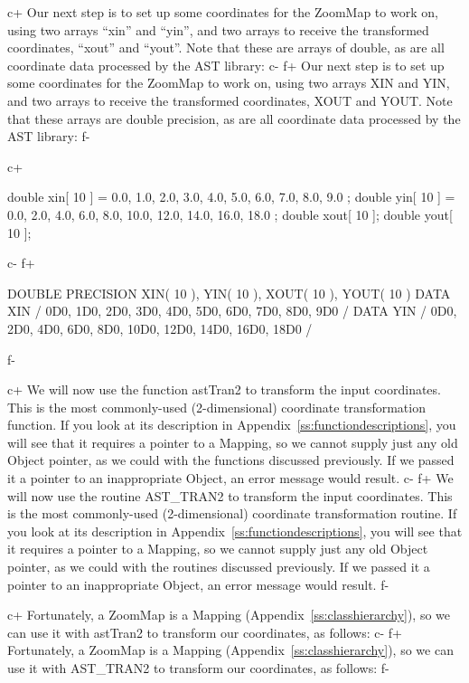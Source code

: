 \documentclass[twoside,11pt]{starlink}
\providecommand{\appref}[1]{Appendix~\ref{#1}}
\begin{document}
c+
Our next step is to set up some coordinates for the ZoomMap to work
on, using two arrays ``xin'' and ``yin'', and two arrays to receive
the transformed coordinates, ``xout'' and ``yout''.  Note that these
are arrays of double, as are all coordinate data processed by the AST
library:
c-
f+
Our next step is to set up some coordinates for the ZoomMap to work
on, using two arrays XIN and YIN, and two arrays to receive the
transformed coordinates, XOUT and YOUT.  Note that these arrays are
double precision, as are all coordinate data processed by the AST
library:
f-

c+
\small
\begin{terminalv}
double xin[ 10 ] = { 0.0, 1.0, 2.0, 3.0, 4.0, 5.0, 6.0, 7.0, 8.0, 9.0 };
double yin[ 10 ] = { 0.0, 2.0, 4.0, 6.0, 8.0, 10.0, 12.0, 14.0, 16.0, 18.0 };
double xout[ 10 ];
double yout[ 10 ];
\end{terminalv}
\normalsize
c-
f+
\small
\begin{terminalv}
      DOUBLE PRECISION XIN( 10 ), YIN( 10 ), XOUT( 10 ), YOUT( 10 )
      DATA XIN / 0D0, 1D0, 2D0, 3D0, 4D0, 5D0, 6D0, 7D0, 8D0, 9D0 /
      DATA YIN / 0D0, 2D0, 4D0, 6D0, 8D0, 10D0, 12D0, 14D0, 16D0, 18D0 /
\end{terminalv}
\normalsize
f-

c+
We will now use the function astTran2 to transform the input
coordinates. This is the most commonly-used (2-dimensional) coordinate
transformation function. If you look at its description in
\appref{ss:functiondescriptions}, you will see that it requires a
pointer to a Mapping, so we cannot supply just any old Object pointer,
as we could with the functions discussed previously. If we passed it a
pointer to an inappropriate Object, an error message would result.
c-
f+
We will now use the routine AST\_TRAN2 to transform the input
coordinates. This is the most commonly-used (2-dimensional) coordinate
transformation routine. If you look at its description in
\appref{ss:functiondescriptions}, you will see that it requires a
pointer to a Mapping, so we cannot supply just any old Object pointer,
as we could with the routines discussed previously. If we passed it a
pointer to an inappropriate Object, an error message would result.
f-

c+
Fortunately, a ZoomMap is a Mapping (\appref{ss:classhierarchy}), so we
can use it with astTran2 to transform our coordinates, as follows:
c-
f+
Fortunately, a ZoomMap is a Mapping (\appref{ss:classhierarchy}), so we
can use it with AST\_TRAN2 to transform our coordinates, as follows:
f-
\end{document}
